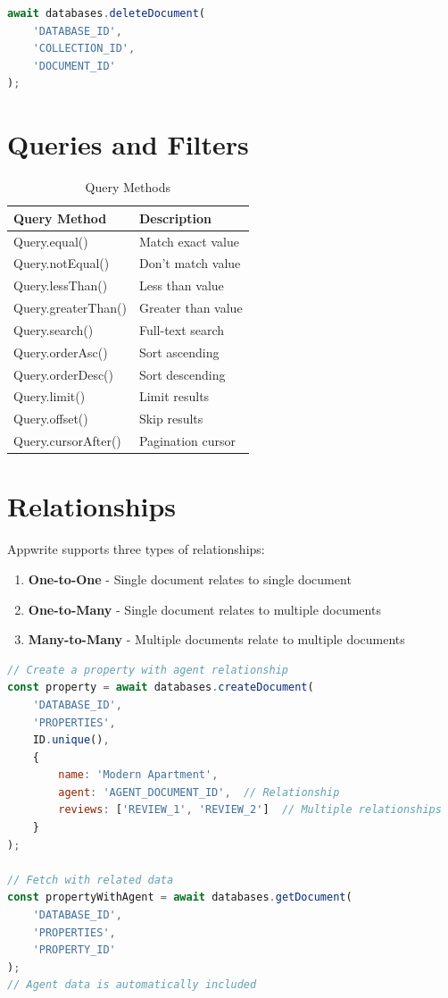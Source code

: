 \documentclass[11pt,a4paper,oneside]{book}
\begin{document}
\begin{lstlisting}[language=JavaScript, caption=Deleting a Document]
await databases.deleteDocument(
    'DATABASE_ID',
    'COLLECTION_ID',
    'DOCUMENT_ID'
);
\end{lstlisting}

\section{Queries and Filters}

\begin{table}[h]
\small
\centering
\begin{tabularx}{\textwidth}{l X}
\toprule
\textbf{Query Method} & \textbf{Description} \\
\midrule
Query.equal() & Match exact value \\
Query.notEqual() & Don't match value \\
Query.lessThan() & Less than value \\
Query.greaterThan() & Greater than value \\
Query.search() & Full-text search \\
Query.orderAsc() & Sort ascending \\
Query.orderDesc() & Sort descending \\
Query.limit() & Limit results \\
Query.offset() & Skip results \\
Query.cursorAfter() & Pagination cursor \\
\bottomrule
\end{tabularx}
\caption{Query Methods}
\end{table}

\section{Relationships}

Appwrite supports three types of relationships:

\begin{enumerate}
    \item \textbf{One-to-One} - Single document relates to single document
    \item \textbf{One-to-Many} - Single document relates to multiple documents
    \item \textbf{Many-to-Many} - Multiple documents relate to multiple documents
\end{enumerate}

\begin{lstlisting}[language=JavaScript, caption=Using Relationships]
// Create a property with agent relationship
const property = await databases.createDocument(
    'DATABASE_ID',
    'PROPERTIES',
    ID.unique(),
    {
        name: 'Modern Apartment',
        agent: 'AGENT_DOCUMENT_ID',  // Relationship
        reviews: ['REVIEW_1', 'REVIEW_2']  // Multiple relationships
    }
);

// Fetch with related data
const propertyWithAgent = await databases.getDocument(
    'DATABASE_ID',
    'PROPERTIES',
    'PROPERTY_ID'
);
// Agent data is automatically included
\end{lstlisting}
\end{document}
